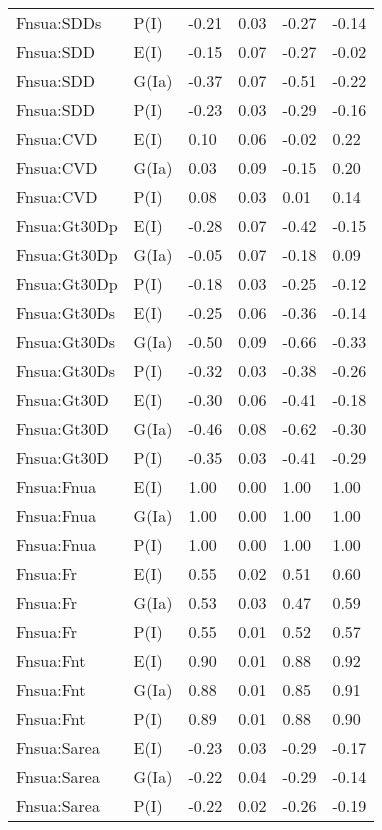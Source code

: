 \begin{center}
\begin{longtable}{|p{1.1in}|p{0.7in}|p{0.7in}|p{0.6in}|p{0.6in}|p{0.6in}|}
  Fnsua:SDDs & P(I) & -0.21 & 0.03 & -0.27 & -0.14 \\ 
  Fnsua:SDD & E(I) & -0.15 & 0.07 & -0.27 & -0.02 \\ 
  Fnsua:SDD & G(Ia) & -0.37 & 0.07 & -0.51 & -0.22 \\ 
  Fnsua:SDD & P(I) & -0.23 & 0.03 & -0.29 & -0.16 \\ 
  Fnsua:CVD & E(I) & 0.10 & 0.06 & -0.02 & 0.22 \\ 
  Fnsua:CVD & G(Ia) & 0.03 & 0.09 & -0.15 & 0.20 \\ 
  Fnsua:CVD & P(I) & 0.08 & 0.03 & 0.01 & 0.14 \\ 
  Fnsua:Gt30Dp & E(I) & -0.28 & 0.07 & -0.42 & -0.15 \\ 
  Fnsua:Gt30Dp & G(Ia) & -0.05 & 0.07 & -0.18 & 0.09 \\ 
  Fnsua:Gt30Dp & P(I) & -0.18 & 0.03 & -0.25 & -0.12 \\ 
  Fnsua:Gt30Ds & E(I) & -0.25 & 0.06 & -0.36 & -0.14 \\ 
  Fnsua:Gt30Ds & G(Ia) & -0.50 & 0.09 & -0.66 & -0.33 \\ 
  Fnsua:Gt30Ds & P(I) & -0.32 & 0.03 & -0.38 & -0.26 \\ 
  Fnsua:Gt30D & E(I) & -0.30 & 0.06 & -0.41 & -0.18 \\ 
  Fnsua:Gt30D & G(Ia) & -0.46 & 0.08 & -0.62 & -0.30 \\ 
  Fnsua:Gt30D & P(I) & -0.35 & 0.03 & -0.41 & -0.29 \\ 
  Fnsua:Fnua & E(I) & 1.00 & 0.00 & 1.00 & 1.00 \\ 
  Fnsua:Fnua & G(Ia) & 1.00 & 0.00 & 1.00 & 1.00 \\ 
  Fnsua:Fnua & P(I) & 1.00 & 0.00 & 1.00 & 1.00 \\ 
  Fnsua:Fr & E(I) & 0.55 & 0.02 & 0.51 & 0.60 \\ 
  Fnsua:Fr & G(Ia) & 0.53 & 0.03 & 0.47 & 0.59 \\ 
  Fnsua:Fr & P(I) & 0.55 & 0.01 & 0.52 & 0.57 \\ 
  Fnsua:Fnt & E(I) & 0.90 & 0.01 & 0.88 & 0.92 \\ 
  Fnsua:Fnt & G(Ia) & 0.88 & 0.01 & 0.85 & 0.91 \\ 
  Fnsua:Fnt & P(I) & 0.89 & 0.01 & 0.88 & 0.90 \\ 
  Fnsua:Sarea & E(I) & -0.23 & 0.03 & -0.29 & -0.17 \\ 
  Fnsua:Sarea & G(Ia) & -0.22 & 0.04 & -0.29 & -0.14 \\ 
  Fnsua:Sarea & P(I) & -0.22 & 0.02 & -0.26 & -0.19 \\ 

\end{longtable}
\end{center}
